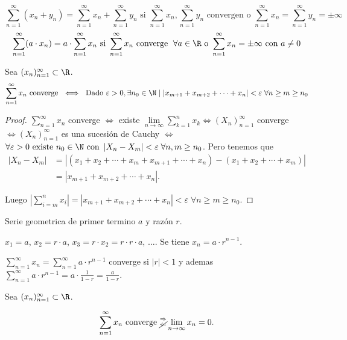 \begin{remark}
	\[
		\sum_{n =1}^{\infty} (x_n + y_n) = \sum_{n =1}^{\infty} x_n + \sum_{n =1}^{\infty} y_n \text{ si } \sum_{n =1}^{\infty} x_n, \sum_{n =1}^{\infty} y_n \text{ convergen o } \sum_{n =1}^{\infty} x_n = \sum_{n =1}^{\infty} y_n = \pm \infty
	\]
	\[
		\sum_{n =1}^{\infty} (a \cdot x_n) = a \cdot \sum_{n =1}^{\infty} x_n \text{ si } \sum_{n =1}^{\infty} x_n \text{ converge }  \; \forall a \in \R \text{ o } \sum_{n =1}^{\infty} x_n = \pm \infty \text{ con } a \neq 0
	\]
\end{remark}
\begin{proposition}
	Sea \((x_n)^{\infty}_{n=1} \subset \R \).
	\[
		\sum_{n =1}^{\infty} x_n \text{ converge } \iff \text{ Dado } \varepsilon > 0, \exists n_{0 } \in \N \mid \left\vert x_{m+1} + x_{m+2} + \cdots + x_n  \right\vert < \varepsilon \;\forall n \geq m \geq n_0
	\]
\end{proposition}
\begin{proof}
	\(\sum_{n =1}^{\infty} x_n \) converge \(\iff \) existe \(\lim\limits_{n \to \infty} \sum_{k =1}^{n } x_k \iff (X_n)^{\infty}_{n=1}\) converge \(\iff (X_n)^{\infty}_{n=1}\) es una sucesión de Cauchy \( \iff\) \( \forall \varepsilon > 0 \text{ existe } n_0 \in \N \text{ con } \left\vert X_n - X_m  \right\vert < \varepsilon\; \forall n,m \geq n_0\). Pero tenemos que
	\begin{align*}
		\left\vert X_n - X_m  \right\vert & = \left\vert (x_1 + x_2 + \cdots + x_m + x_{m+1} + \cdots + x_n) - (x_1 + x_2 + \cdots + x_m) \right\vert \\ & = \left\vert x_{m+1} + x_{m+2} + \cdots + x_n  \right\vert.
	\end{align*}

	Luego \(\left\vert \sum_{i=m }^{n } x_i \right\vert = \left\vert x_{m+1} + x_{m+2} + \cdots + x_n  \right\vert < \varepsilon \; \forall n \geq m \geq n_0 \).
\end{proof}
\begin{example}
	Serie geometrica de primer termino \( a \) y razón \(r \).

	\(x_1 = a\), \(x_2 = r \cdot a \), \(x_3 = r \cdot x_2 = r \cdot r \cdot a\), \(\ldots \). Se tiene \(x_n =a \cdot r^{n-1} \).

	\(\sum_{n =1}^{\infty} x_n = \sum_{n =1}^{\infty} a \cdot r^{n - 1 } \) converge si \(|r| < 1 \) y ademas \(\sum_{n =1}^{\infty} a \cdot r^{n-1} = a \cdot \frac{1}{1-r} = \frac{a }{1 - r} \).
\end{example}
\begin{proposition}
	Sea \((x_n)^{\infty}_{n=1} \subset \R \).

	\[
		\sum_{n =1}^{\infty} x_n \text{ converge } \substack{\Rightarrow \\ \cancel \Leftarrow} \lim\limits_{n \to \infty} x_n = 0.
	\]
\end{proposition}
